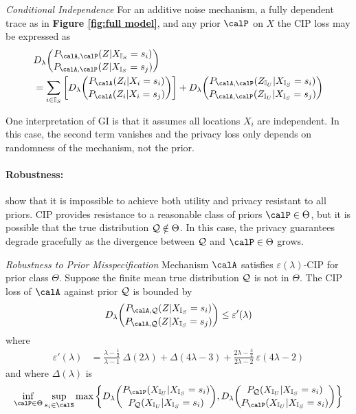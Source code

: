 \begin{lemma}\emph{Conditional Independence}
	\label{lem: renyi additive loss}
	For an additive noise mechanism, a fully dependent trace as in \textbf{Figure \ref{fig:full model}}, and any prior $\calP$ on $X$ the CIP loss may be expressed as
	\begin{align}
	\label{eqn:two terms}
		&D_\lambda \binom{P_{\calA, \calP}(Z | \Xs = s_i)}{P_{\calA, \calP}(Z | \Xs = s_j)}  \\ 
		\vspace{2em}
		&= \sum_{i \in \Is} \bigg[ D_\lambda \binom{P_\calA(Z_i | X_i = s_i)}{P_\calA(Z_i | X_i = s_j)} \bigg]
		+ D_\lambda \binom{P_{\calA, \calP}(\Zu | \Xs = s_i)}{P_{\calA, \calP}(\Zu | \Xs = s_j)} \notag
	\end{align}
\end{lemma} 
One interpretation of GI is that it assumes all locations $X_i$ are independent. In this case, the second term vanishes and the privacy loss only depends on randomness of the mechanism, not the prior. 

\paragraph{Robustness:}
\cite{no_free_lunch} show that it is impossible to achieve both utility and privacy resistant to all priors. CIP provides resistance to a reasonable class of priors $\calP \in \Theta$, but it is possible that the true distribution $\mathcal{Q} \notin \Theta$. In this case, the privacy guarantees degrade gracefully as the divergence between $\mathcal{Q}$ and $\calP \in \Theta$ grows. 
\begin{theorem}\emph{Robustness to Prior Misspecification}
\label{thm: prior misspecification}
	Mechanism $\calA$ satisfies $\varepsilon(\lambda)$-CIP for prior class $\Theta$. Suppose the finite mean true distribution $\mathcal{Q}$ is not in $\Theta$. The CIP loss of $\calA$ against prior $\mathcal{Q}$ is bounded by 
	\begin{align*}
		D_\lambda \binom{P_{\calA, \calQ}(Z | \Xs = s_i)}{P_{\calA, \calQ}(Z | \Xs = s_j)} \leq \varepsilon'(\lambda)
	\end{align*}
	where
	\begin{align*}
		\varepsilon'(\lambda) 
		&= \frac{\lambda - \frac{1}{2}}{\lambda - 1} \ \Delta(2\lambda) + 
		\Delta(4\lambda - 3) +
		\frac{2\lambda - \frac{3}{2}}{2\lambda - 2} \ \varepsilon(4 \lambda -2)
	\end{align*}
	and where $\Delta(\lambda)$ is
	\begin{align*}
		\inf_{\calP \in \Theta} \sup_{s_i \in \calS} \max \bigg\{ 
		D_\lambda \binom{P_{ \calP}(\Xu | \Xs = s_i)}{P_{ \calQ}(\Xu | \Xs = s_i)}, 
		D_\lambda \binom{P_{ \calQ}(\Xu | \Xs = s_i)}{P_{ \calP}(\Xu | \Xs = s_i)}
		\bigg\}
	\end{align*}
\end{theorem}

